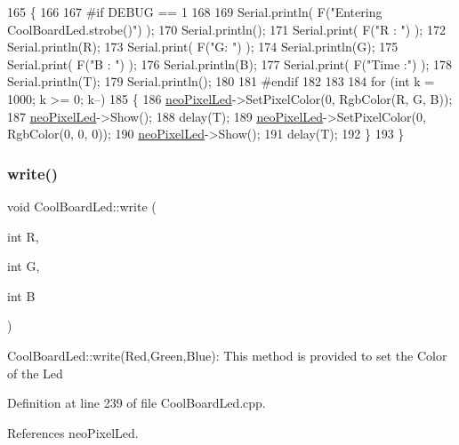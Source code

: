 \begin{DoxyCode}
165 \{
166 
167 \textcolor{preprocessor}{#if DEBUG == 1}
168 
169     Serial.println( F(\textcolor{stringliteral}{"Entering CoolBoardLed.strobe()"}) );
170     Serial.println();
171     Serial.print( F(\textcolor{stringliteral}{"R : "}) );
172     Serial.println(R);
173     Serial.print( F(\textcolor{stringliteral}{"G: "}) );
174     Serial.println(G);
175     Serial.print( F(\textcolor{stringliteral}{"B : "}) );
176     Serial.println(B);
177     Serial.print( F(\textcolor{stringliteral}{"Time :"}) );
178     Serial.println(T);
179     Serial.println();
180 
181 \textcolor{preprocessor}{#endif  }
182 
183     
184     \textcolor{keywordflow}{for} (\textcolor{keywordtype}{int} k = 1000; k >= 0; k--) 
185     \{
186         \hyperlink{classCoolBoardLed_ac2c13fa462a010cd9242bf297c013923}{neoPixelLed}->SetPixelColor(0, RgbColor(R, G, B));
187         \hyperlink{classCoolBoardLed_ac2c13fa462a010cd9242bf297c013923}{neoPixelLed}->Show();
188         delay(T);
189         \hyperlink{classCoolBoardLed_ac2c13fa462a010cd9242bf297c013923}{neoPixelLed}->SetPixelColor(0, RgbColor(0, 0, 0));
190         \hyperlink{classCoolBoardLed_ac2c13fa462a010cd9242bf297c013923}{neoPixelLed}->Show();
191         delay(T);
192     \}
193 \}
\end{DoxyCode}
\mbox{\label{classCoolBoardLed_a30fadd4cbec17ceea428bf7a32207e87}} 
\subsubsection{\texorpdfstring{write()}{write()}}
{\footnotesize\ttfamily void Cool\+Board\+Led\+::write (\begin{DoxyParamCaption}\item[{int}]{R,  }\item[{int}]{G,  }\item[{int}]{B }\end{DoxyParamCaption})}

Cool\+Board\+Led\+::write(\+Red,\+Green,\+Blue)\+: This method is provided to set the Color of the Led 

Definition at line 239 of file Cool\+Board\+Led.\+cpp.



References neo\+Pixel\+Led.


